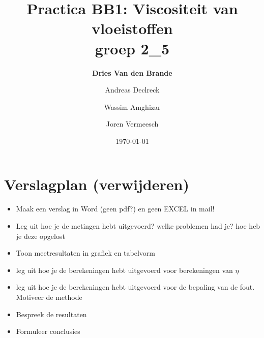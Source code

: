 \documentclass[12pt]{article}
\begin{document}
    
\title{\textbf{Practica BB1: Viscositeit van vloeistoffen}\\\small{groep 2\_5}}
\author{\textbf{Dries Van den Brande} \and Andreas Declreck \and Wassim Amghizar \and Joren Vermeesch}
\date{\today}

\maketitle

\section*{Verslagplan (verwijderen)}
\begin{itemize}
    \item Maak een verslag in Word (geen pdf?) en geen EXCEL in mail!
    \item Leg uit hoe je de metingen hebt uitgevoerd? welke problemen had je? hoe heb je deze opgelost
    \item Toon meetresultaten in grafiek en tabelvorm
    \item leg uit hoe je de berekeningen hebt uitgevoerd voor berekeningen van $\eta$
    \item leg uit hoe je de berekeningen hebt uitgevoerd voor de bepaling van de fout. Motiveer de methode
    \item Bespreek de resultaten
    \item Formuleer conclusies
\end{itemize}



%


















\end{document}
